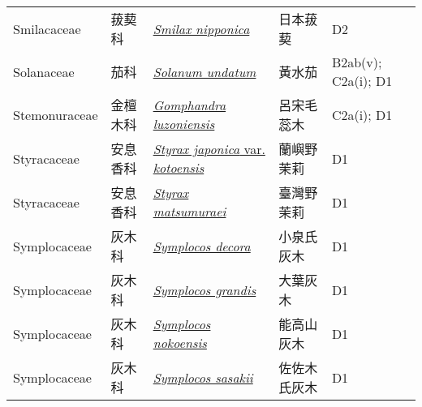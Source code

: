 {\begin{longtable}{L{2.5cm}L{2cm}L{5cm}L{2.5cm}L{3cm}}
    Smilacaceae & 菝葜科 & \href{http://www.theplantlist.org/tpl1.1/search?q=Smilax+nipponica}{\textit{Smilax nipponica} } & 日本菝葜 & D2    \\
    Solanaceae & 茄科 & \href{http://www.theplantlist.org/tpl1.1/search?q=Solanum+undatum}{\textit{Solanum undatum} } & 黃水茄 & B2ab(v); C2a(i); D1    \\
    Stemonuraceae & 金檀木科 & \href{http://www.theplantlist.org/tpl1.1/search?q=Gomphandra+luzoniensis}{\textit{Gomphandra luzoniensis} } & 呂宋毛蕊木 & C2a(i); D1    \\
    Styracaceae & 安息香科 & \href{http://www.theplantlist.org/tpl1.1/search?q=Styrax+japonica+var.+kotoensis}{\textit{Styrax japonica} var. \textit{kotoensis} } & 蘭嶼野茉莉 & D1    \\
    Styracaceae & 安息香科 & \href{http://www.theplantlist.org/tpl1.1/search?q=Styrax+matsumuraei}{\textit{Styrax matsumuraei} } & 臺灣野茉莉 & D1    \\
    Symplocaceae & 灰木科 & \href{http://www.theplantlist.org/tpl1.1/search?q=Symplocos+decora}{\textit{Symplocos decora} } & 小泉氏灰木 & D1    \\
    Symplocaceae & 灰木科 & \href{http://www.theplantlist.org/tpl1.1/search?q=Symplocos+grandis}{\textit{Symplocos grandis} } & 大葉灰木 & D1    \\
    Symplocaceae & 灰木科 & \href{http://www.theplantlist.org/tpl1.1/search?q=Symplocos+nokoensis}{\textit{Symplocos nokoensis} } & 能高山灰木 & D1    \\
    Symplocaceae & 灰木科 & \href{http://www.theplantlist.org/tpl1.1/search?q=Symplocos+sasakii}{\textit{Symplocos sasakii} } & 佐佐木氏灰木 & D1    \\

\end{longtable}}
